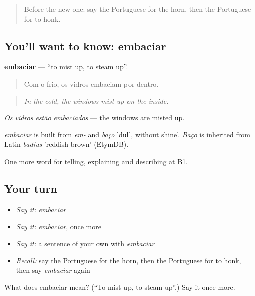 \label{lesson:PT-C403-embaciar}



\begin{quote}
Before the new one: say the Portuguese for the horn, then the Portuguese for to honk.
\end{quote}

\subsection*{You'll want to know: embaciar}
\textbf{embaciar} — \textquotedblleft{}to mist up, to steam up\textquotedblright{}.

\begin{quote}
Com o frio, os vidros embaciam por dentro.
\end{quote}

\begin{quote}
\emph{In the cold, the windows mist up on the inside.}
\end{quote}

\emph{Os vidros estão embaciados} — the windows are misted up.

\begin{cousinweb}
\emph{embaciar} is built from \emph{em-} and \emph{baço} 'dull, without shine'. \emph{Baço} is inherited from Latin \emph{badius} 'reddish-brown' (EtymDB).
\end{cousinweb}

\begin{grammarlens}[title={What you've built}]
One more word for telling, explaining and describing at B1.
\end{grammarlens}

\subsection*{Your turn}
\begin{itemize}
\raggedright
  \item \emph{Say it:} \emph{embaciar}
  \item \emph{Say it:} \emph{embaciar}, once more
  \item \emph{Say it:} a sentence of your own with \emph{embaciar}
  \item \emph{Recall:} say the Portuguese for the horn, then the Portuguese for to honk, then say \emph{embaciar} again
\end{itemize}

\begin{tcolorbox}[breakable,colback=teal!4,colframe=teal!35!black,title={Before you move on}]
What does embaciar mean? (\textquotedblleft{}To mist up, to steam up\textquotedblright{}.) Say it once more.
\end{tcolorbox}
